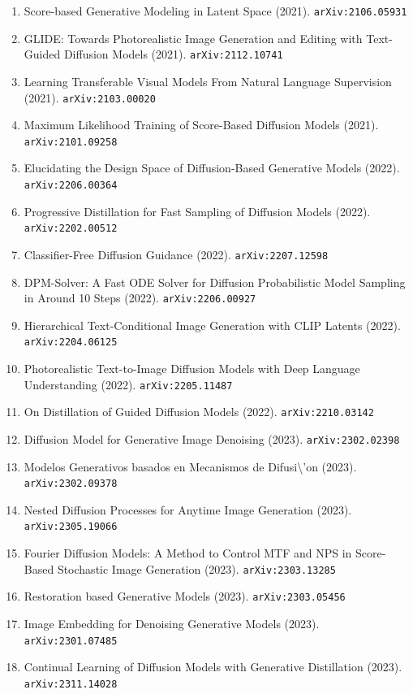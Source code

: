 \documentclass[11pt]{article}
\begin{document}
\begin{enumerate}
  Sampling Speed (2021). \texttt{arXiv:2101.02388}
  \item Score-based Generative Modeling in Latent Space (2021). \texttt{arXiv:2106.05931}
  \item GLIDE: Towards Photorealistic Image Generation and Editing with
  Text-Guided Diffusion Models (2021). \texttt{arXiv:2112.10741}
  \item Learning Transferable Visual Models From Natural Language Supervision (2021). \texttt{arXiv:2103.00020}
  \item Maximum Likelihood Training of Score-Based Diffusion Models (2021). \texttt{arXiv:2101.09258}
  \item Elucidating the Design Space of Diffusion-Based Generative Models (2022). \texttt{arXiv:2206.00364}
  \item Progressive Distillation for Fast Sampling of Diffusion Models (2022). \texttt{arXiv:2202.00512}
  \item Classifier-Free Diffusion Guidance (2022). \texttt{arXiv:2207.12598}
  \item DPM-Solver: A Fast ODE Solver for Diffusion Probabilistic Model Sampling
  in Around 10 Steps (2022). \texttt{arXiv:2206.00927}
  \item Hierarchical Text-Conditional Image Generation with CLIP Latents (2022). \texttt{arXiv:2204.06125}
  \item Photorealistic Text-to-Image Diffusion Models with Deep Language
  Understanding (2022). \texttt{arXiv:2205.11487}
  \item On Distillation of Guided Diffusion Models (2022). \texttt{arXiv:2210.03142}
  \item Diffusion Model for Generative Image Denoising (2023). \texttt{arXiv:2302.02398}
  \item Modelos Generativos basados en Mecanismos de Difusi\textbackslash{}'on (2023). \texttt{arXiv:2302.09378}
  \item Nested Diffusion Processes for Anytime Image Generation (2023). \texttt{arXiv:2305.19066}
  \item Fourier Diffusion Models: A Method to Control MTF and NPS in Score-Based
  Stochastic Image Generation (2023). \texttt{arXiv:2303.13285}
  \item Restoration based Generative Models (2023). \texttt{arXiv:2303.05456}
  \item Image Embedding for Denoising Generative Models (2023). \texttt{arXiv:2301.07485}
  \item Continual Learning of Diffusion Models with Generative Distillation (2023). \texttt{arXiv:2311.14028}

\end{enumerate}
\end{document}
